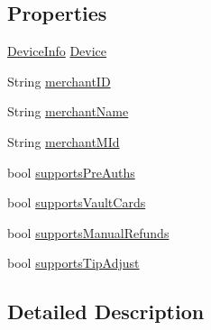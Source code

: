 \subsection*{Properties}
\begin{DoxyCompactItemize}
\item 
\hyperlink{classcom_1_1clover_1_1remotepay_1_1sdk_1_1_device_info}{Device\+Info} \hyperlink{classcom_1_1clover_1_1remotepay_1_1sdk_1_1_merchant_info_a1b5273a52fae3c13f8f40e2f27748ac8}{Device}
\item 
String \hyperlink{classcom_1_1clover_1_1remotepay_1_1sdk_1_1_merchant_info_af2cf534217f5e9a35b343036e84da75e}{merchant\+ID}
\item 
String \hyperlink{classcom_1_1clover_1_1remotepay_1_1sdk_1_1_merchant_info_ad678b4439281013f80c35cd91dc74309}{merchant\+Name}
\item 
String \hyperlink{classcom_1_1clover_1_1remotepay_1_1sdk_1_1_merchant_info_a93faa88fa72ac66c5bd3abcdc3993b48}{merchant\+M\+Id}
\item 
bool \hyperlink{classcom_1_1clover_1_1remotepay_1_1sdk_1_1_merchant_info_a8a7b86f9a1c17c61b94804341978421d}{supports\+Pre\+Auths}
\item 
bool \hyperlink{classcom_1_1clover_1_1remotepay_1_1sdk_1_1_merchant_info_a1252d83fa9541159d3c81aedd237a9ca}{supports\+Vault\+Cards}
\item 
bool \hyperlink{classcom_1_1clover_1_1remotepay_1_1sdk_1_1_merchant_info_ae9aad4e2425b1e3ab534c929b6f5ba94}{supports\+Manual\+Refunds}
\item 
bool \hyperlink{classcom_1_1clover_1_1remotepay_1_1sdk_1_1_merchant_info_a9e974e5ead593db0ec736dd52b265c7e}{supports\+Tip\+Adjust}
\end{DoxyCompactItemize}


\subsection{Detailed Description}


